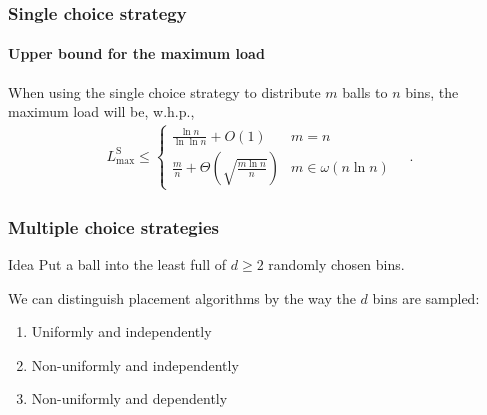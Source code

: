 \documentclass[serif,professionalfonts]{beamer}
\newcommand\load{L_{\mathrm{max}}}
\newcommand\loadS{\load^{\mathrm{S}}}
\begin{document}
\begin{frame}
\frametitle{Single choice strategy}
\framesubtitle{Upper bound for the maximum load}
\begin{theorem}
When using the single choice strategy to distribute $m$ balls to $n$ bins, the maximum load will be, w.h.p.,
\begin{align*}
\loadS \leq 
	\begin{cases}
    \frac{\ln n}{\ln\ln n} + O(1)              & m = n \\
    \frac{m}{n} + \Theta\left(\sqrt{\frac{m\ln n}{n}} \right)              & m \in \omega(n \ln n)
    \end{cases} \quad .
\end{align*}
\end{theorem}
\end{frame}

\begin{frame}
\frametitle{Multiple choice strategies}

\begin{exampleblock}{Idea}
Put a ball into the \alert{least full} of $d\geq2$ randomly chosen bins.
\end{exampleblock}

\bigskip
We can distinguish placement algorithms by the way the $d$ \alert{bins are sampled}:
\begin{enumerate}
\item Uniformly and independently
\item Non-uniformly and independently
\item Non-uniformly and dependently
\end{enumerate}
\end{frame}
\end{document}
